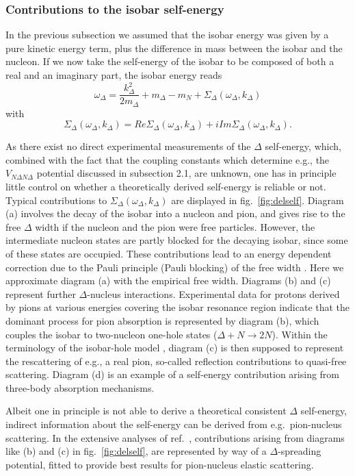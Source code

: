 \subsubsection{Contributions to the isobar self-energy}

In the previous subsection we assumed that the isobar energy
was given by a pure kinetic energy term, plus the difference in mass
between the isobar and the nucleon.
If we now take  the self-energy of the isobar to be
composed of both a real and  an
imaginary part, the isobar energy reads
\[
\omega_{\Delta} = \frac{k_{\Delta}^{2}}{2m_{\Delta}}
+m_{\Delta}-m_{N} + \Sigma_{\Delta}(\omega_{\Delta},k_{\Delta})
\]
with
\[
\Sigma_{\Delta}(\omega_{\Delta},k_{\Delta})=
Re\Sigma_{\Delta}(\omega_{\Delta},k_{\Delta})
+iIm\Sigma_{\Delta}(\omega_{\Delta},k_{\Delta}).
\]

As there exist no direct experimental measurements of the $\Delta$
self-energy, which, combined with the fact that the coupling constants
which determine e.g., the $V_{N\Delta N\Delta}$ potential
discussed in subsection 2.1, are unknown, one has in principle
little control on
whether a theoretically derived self-energy is reliable or not.
Typical contributions to $\Sigma_{\Delta}(\omega_{\Delta},k_{\Delta})$
are displayed in fig.\ \ref{fig:delself}. Diagram (a)
involves the decay of the isobar into a nucleon and pion,
and gives rise to the free $\Delta$ width if the nucleon and the pion
were free particles. However, the intermediate nucleon states are partly
blocked for the decaying isobar, since some of these states are occupied.
These contributions lead to an energy dependent correction due to the
Pauli principle (Pauli blocking) of the free width \cite{ow79}. Here we
approximate diagram (a) with the empirical free width. 
Diagrams (b) and (c) represent further $\Delta$-nucleus interactions.
Experimental data for protons derived by pions at various energies covering
the isobar resonance region indicate that
the dominant process for pion absorption
is represented by  diagram (b), which couples the isobar to two-nucleon
one-hole states ($\Delta + N \rightarrow 2N$).
Within the terminology of the isobar-hole model \cite{ew88,otw83},
diagram (c) is then supposed to represent the rescattering of e.g., a real
pion, so-called reflection contributions to quasi-free scattering.
Diagram (d) is an example of a
self-energy contribution arising from three-body
absorption mechanisms. 


Albeit one in principle is not able to derive a theoretical
consistent $\Delta$ self-energy, indirect information about the self-energy
can be derived from e.g.\ pion-nucleus scattering. In the extensive
analyses of ref.\ \cite{hirata80}, contributions arising from diagrams
like (b) and (c) in fig.\ \ref{fig:delself}, are represented by way
of a $\Delta$-spreading potential, fitted to provide best results for
pion-nucleus elastic scattering.

